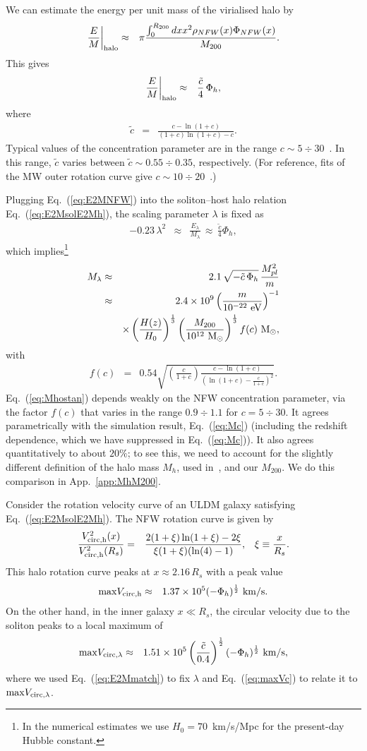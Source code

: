 \documentclass[aps,prd,floats,superscriptaddress,showpacs,nofootinbib,twocolumn,preprintnumbers]{revtex4-1}%
\def\be{\begin{eqnarray}}
\def\ee{\end{eqnarray}}
\def\no{\nonumber}
\begin{document}
We can estimate the energy per unit mass of the virialised halo by
%
\be \frac{E}{M}\bigg|_{\rm halo}&\approx&\pi\frac{\int_0^{R_{200}} dxx^2\rho_{NFW}(x)\Phi_{NFW}(x)}{M_{200}}.\ee
%
This gives
%
\be\label{eq:E2MNFW} \frac{E}{M}\bigg|_{\rm halo}&\approx&\frac{\tilde c}{4}\,\Phi_h,
\ee
where
\be
\tilde c&=&\frac{c-\ln(1+c)}{(1+c)\ln(1+c)-c}.\ee
% 
Typical values of the concentration parameter are in the range
$c\sim5\div 30$~\cite{BoylanKolchin:2009an}. In this range, $\tilde c$
varies between $\tilde c\sim0.55 \div 0.35$, respectively. (For reference,
fits of the MW outer rotation curve give
$c\sim10\div 20$~\cite{Piffl:2014mfa}.) 

Plugging Eq.~(\ref{eq:E2MNFW}) into the soliton--host halo relation
Eq.~(\ref{eq:E2MsolE2Mh}), the scaling parameter $\lambda$ is fixed as 
%
\be\label{eq:E2Mmatch} -0.23\,\lambda^2&\approx&\frac{E_\lambda}{M_\lambda}\,\approx\,\frac{\tilde c}{4}\Phi_h,\ee
which implies\footnote{In the numerical estimates we use
  $H_0=70$~km/s/Mpc for the present-day Hubble constant.}
%
\be \label{eq:Mhostan}M_\lambda&\approx&2.1\,\sqrt{-\tilde c\,\Phi_h}\,\frac{M_{pl}^2}{m}\nonumber\\
&\approx&2.4\times10^9\left(\frac{m}{10^{-22}~\rm eV}\right)^{-1}\nonumber\\
&&\times\left(\frac{H(z)}{H_0}\right)^{\frac{1}{3}}\left(\frac{M_{200}}{10^{12}~\rm M_\odot}\right)^{\frac{1}{3}}f(c)~{\rm M_\odot},
\ee
%
with
\be
f(c)&=&0.54\sqrt{\left(\frac{c}{1+c}\right)\frac{c-{\ln(1+c)}}{\left(\ln(1+c)-\frac{c}{1+c}\right)^2}}.\no
\ee
Eq.~(\ref{eq:Mhostan}) depends weakly on the NFW concentration
parameter, via the factor $f(c)$ that varies in the range $0.9\div1.1$
for $c=5\div 30$.   
It agrees parametrically with the simulation result, Eq.~(\ref{eq:Mc})
(including the redshift dependence, which we have suppressed in
Eq.~(\ref{eq:Mc})). It also agrees quantitatively to about $20\%$; to
see this, we need to account for the slightly different definition of
the halo mass $M_h$, used in~\cite{Schive:2014hza}, and our
$M_{200}$. We do this comparison in App.~\ref{app:MhM200}. 

Consider the rotation velocity curve of an ULDM galaxy satisfying Eq.~(\ref{eq:E2MsolE2Mh}). The NFW rotation curve is given by
%
\be \frac{V^2_{\rm circ,h}(x)}{V^2_{\rm circ,h}(R_s)}&
=&\frac{2(1+\xi)\ln(1+\xi)-2\xi}{\xi(1+\xi)(\ln(4)-1)},\,\,\,\,\,
\xi\equiv \frac{x}{R_s}.\ee
%
This halo rotation curve peaks at $x\approx2.16\,R_s$ with a peak value
%
\be\label{eq:nfwVmax}{\max}V_{\rm
  circ,h}&\approx&1.37\times10^5(-\Phi_h)^{\frac{1}{2}}~{\rm km/s}. 
\ee
%
On the other hand, in the inner galaxy $x\ll R_s$,  
the circular velocity due to the soliton peaks to a local maximum of 
%
\be\label{eq:maxVch} {\max}V_{\rm circ,\lambda}&\approx&1.51\times10^5\left(\frac{\tilde c}{0.4}\right)^{\frac{1}{2}}(-\Phi_h)^{\frac{1}{2}}~{\rm km/s},
\ee
%
where we used Eq.~(\ref{eq:E2Mmatch}) to fix $\lambda$ and Eq.~(\ref{eq:maxVc}) to relate it to ${\max}V_{\rm circ,\lambda}$.
\end{document}
